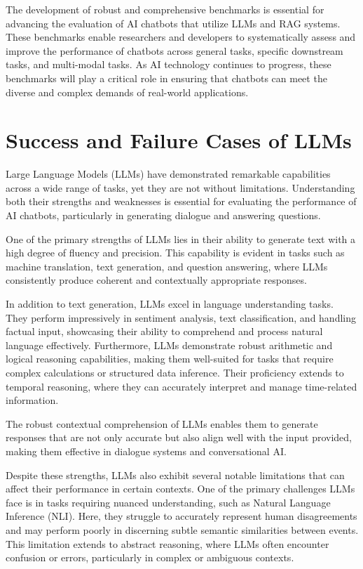 The development of robust and comprehensive benchmarks is essential for advancing the evaluation of AI chatbots that utilize LLMs and RAG systems. These benchmarks enable researchers and developers to systematically assess and improve the performance of chatbots across general tasks, specific downstream tasks, and multi-modal tasks. As AI technology continues to progress, these benchmarks will play a critical role in ensuring that chatbots can meet the diverse and complex demands of real-world applications.

\section{Success and Failure Cases of LLMs}

Large Language Models (LLMs) have demonstrated remarkable capabilities across a wide range of tasks, yet they are not without limitations. Understanding both their strengths and weaknesses is essential for evaluating the performance of AI chatbots, particularly in generating dialogue and answering questions.

One of the primary strengths of LLMs lies in their ability to generate text with a high degree of fluency and precision. This capability is evident in tasks such as machine translation, text generation, and question answering, where LLMs consistently produce coherent and contextually appropriate responses.

In addition to text generation, LLMs excel in language understanding tasks. They perform impressively in sentiment analysis, text classification, and handling factual input, showcasing their ability to comprehend and process natural language effectively. Furthermore, LLMs demonstrate robust arithmetic and logical reasoning capabilities, making them well-suited for tasks that require complex calculations or structured data inference. Their proficiency extends to temporal reasoning, where they can accurately interpret and manage time-related information.

The robust contextual comprehension of LLMs enables them to generate responses that are not only accurate but also align well with the input provided, making them effective in dialogue systems and conversational AI.

Despite these strengths, LLMs also exhibit several notable limitations that can affect their performance in certain contexts. One of the primary challenges LLMs face is in tasks requiring nuanced understanding, such as Natural Language Inference (NLI). Here, they struggle to accurately represent human disagreements and may perform poorly in discerning subtle semantic similarities between events. This limitation extends to abstract reasoning, where LLMs often encounter confusion or errors, particularly in complex or ambiguous contexts.


